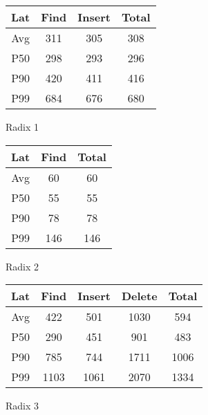 \documentclass[]{article}
\begin{document}
\begin{figure}[H]
    \centering
    \begin{minipage}{0.33\textwidth}
        \centering
            \begin{tabular}{|c|ccc|}
            \hline
                Lat &  Find  & Insert & Total  \\ \hline
                Avg & 311  & 305  & 308   \\ 
                P50 & 298  & 293  & 296   \\ 
                P90 & 420  & 411  & 416   \\ 
                P99 & 684  & 676  & 680   \\ \hline
            \end{tabular}
        \caption{Radix 1}
    \end{minipage}
    \begin{minipage}{0.26\textwidth}
        \centering
            \begin{tabular}{|c|cc|}
            \hline
                Lat &  Find  & Total  \\ \hline
                Avg & 60 & 60  \\ 
                P50 & 55 & 55  \\ 
                P90 & 78 & 78  \\ 
                P99 & 146 & 146  \\ \hline
            \end{tabular}
        \caption{Radix 2}
    \end{minipage}
    \begin{minipage}{0.35\textwidth}
        \centering
            \begin{tabular}{|c|cccc|}
            \hline
                Lat &  Find  & Insert & Delete & Total  \\ \hline
                Avg & 422  & 501  & 1030  & 594   \\ 
                P50 & 290  & 451  & 901  & 483   \\ 
                P90 & 785  & 744  & 1711  & 1006   \\ 
                P99 & 1103  & 1061  & 2070  & 1334   \\ \hline
            \end{tabular}
        \caption{Radix 3}
    \end{minipage}
\end{figure}
\end{document}
